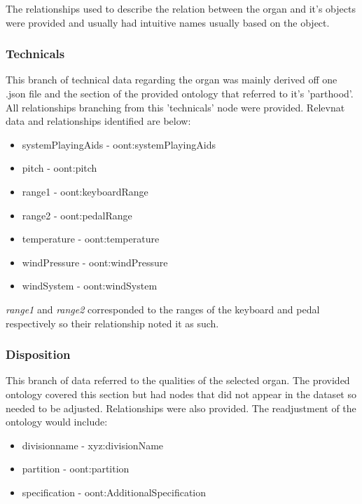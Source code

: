 The relationships used to describe the relation between the organ and it's objects were provided and usually had intuitive names usually based on the object. 

\subsubsection{Technicals}
\hspace*{0.5cm} This branch of technical data regarding the organ was mainly derived off one .json file and the section of the provided ontology that referred to it's 'parthood'. All relationships branching from this 'technicals' node were provided. Relevnat data and relationships identified are below:

\begin{itemize}
    \itemsep0em 
    \item systemPlayingAids - oont:systemPlayingAids
    \item pitch - oont:pitch
    \item range1 -  oont:keyboardRange
    \item range2 - oont:pedalRange
    \item temperature - oont:temperature
    \item windPressure - oont:windPressure
    \item windSystem - oont:windSystem
\end{itemize}

\textit{range1} and \textit{range2} corresponded to the ranges of the keyboard and pedal respectively so their relationship noted it as such. 

\subsubsection{Disposition}
\hspace*{0.5cm} This branch of data referred to the qualities of the selected organ. The provided ontology covered this section but had nodes that did not appear in the dataset so needed to be adjusted. Relationships were also provided. The readjustment of the ontology would include:

\begin{itemize}
    \itemsep0em 
    \item divisionname - xyz:divisionName
    \item partition - oont:partition
    \item specification - oont:AdditionalSpecification
\end{itemize}

